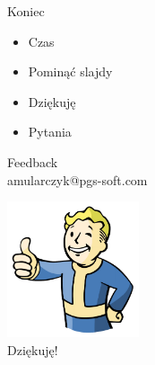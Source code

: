 \documentclass{beamer}
\begin{document}
\begin{frame}{}
	\begin{center}
		\Huge{Koniec}
	\end{center}
\end{frame}

\begin{frame}{}
	\begin{Large}
		\begin{itemize}
			\item Czas
			\item Pominąć slajdy
			\item Dziękuję
			\item Pytania
		\end{itemize}
	\end{Large}
\end{frame}

\begin{frame}{}
	\begin{center}
		\Huge{Feedback}\\
		\Large{amularczyk@pgs-soft.com}
	\end{center}
\end{frame}

\begin{frame}{}
	\begin{center}
  		\includegraphics[height=4cm]{ok.png} \\
		\Huge{Dziękuję!}
	\end{center}
\end{frame}
\end{document}

